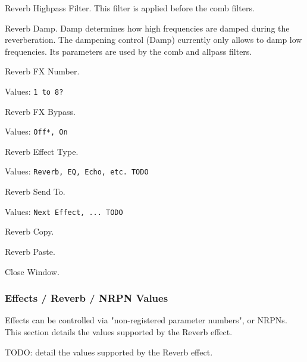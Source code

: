    Reverb Highpass Filter.
   This filter is applied before the comb filters.

   Reverb Damp.
   Damp determines how high frequencies are damped during the
   reverberation.  The dampening control (Damp) currently only allows to
   damp low frequencies. Its parameters are used by the comb and allpass
   filters.

   Reverb FX Number.

   Values: \texttt{1 to 8?}

   Reverb FX Bypass.

   Values: \texttt{Off*, On}

   Reverb Effect Type.

   Values: \texttt{Reverb, EQ, Echo, etc. TODO}

   Reverb Send To.

   Values: \texttt{Next Effect, ... TODO}

   Reverb Copy.

   Reverb Paste.

   Close Window.

\subsubsection{Effects / Reverb / NRPN Values}
\label{subsubsec:effects_edit_reverb_nrpn}

   Effects can be controlled via "non-registered parameter numbers", or NRPNs.
   This section details the values supported by the Reverb effect.

   TODO:  detail the values supported by the Reverb effect.

